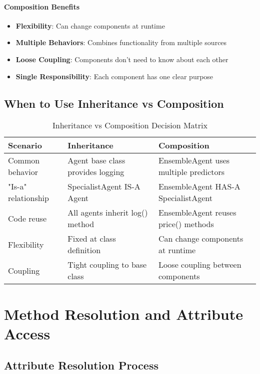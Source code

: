 \paragraph{Composition Benefits}
\begin{itemize}
\item \textbf{Flexibility}: Can change components at runtime
\item \textbf{Multiple Behaviors}: Combines functionality from multiple sources
\item \textbf{Loose Coupling}: Components don't need to know about each other
\item \textbf{Single Responsibility}: Each component has one clear purpose
\end{itemize}

\subsection{When to Use Inheritance vs Composition}

\begin{table}[htbp]
\centering
\begin{tabular}{@{}p{3cm}p{5cm}p{5cm}@{}}
\toprule
\textbf{Scenario} & \textbf{Inheritance} & \textbf{Composition} \\
\midrule
Common behavior & Agent base class provides logging & EnsembleAgent uses multiple predictors \\
"Is-a" relationship & SpecialistAgent IS-A Agent & EnsembleAgent HAS-A SpecialistAgent \\
Code reuse & All agents inherit log() method & EnsembleAgent reuses price() methods \\
Flexibility & Fixed at class definition & Can change components at runtime \\
Coupling & Tight coupling to base class & Loose coupling between components \\
\bottomrule
\end{tabular}
\caption{Inheritance vs Composition Decision Matrix}
\label{tab:inheritance_composition}
\end{table}

\section{Method Resolution and Attribute Access}

\subsection{Attribute Resolution Process}

